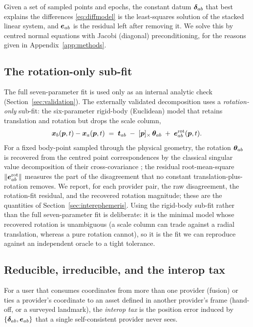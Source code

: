 Given a set of sampled points and epochs, the constant datum $\bm{\delta}_{ab}$ that best
explains the differences \eqref{eq:diffmodel} is the least-squares solution of the
stacked linear system, and $\bm{e}_{ab}$ is the residual left after removing it. We
solve this by centred normal equations with Jacobi (diagonal) preconditioning, for
the reasons given in Appendix~\ref{app:methods}.

\subsection{The rotation-only sub-fit}
\label{sec:rotonly}

The full seven-parameter fit is used only as an internal analytic check
(Section~\ref{sec:validation}). The externally validated decomposition uses a
\emph{rotation-only} sub-fit: the six-parameter rigid-body (Euclidean) model that
retains translation and rotation but drops the scale column,
\begin{equation}
  \bm{x}_b(\bm{p},t) - \bm{x}_a(\bm{p},t)
  \;=\; \bm{t}_{ab} \;-\;[\bm{p}]_\times\,\bm{\theta}_{ab}
   \;+\; \bm{e}^{\mathrm{rot}}_{ab}(\bm{p},t).
  \label{eq:rotonly}
\end{equation}
For a fixed body-point sampled through the physical geometry, the rotation
$\bm{\theta}_{ab}$ is recovered from the centred point correspondences by the classical
singular value decomposition of their cross-covariance
\citep{arun1987leastsquares}; the residual root-mean-square
$\|\bm{e}^{\mathrm{rot}}_{ab}\|$ measures the part of the disagreement that no
constant translation-plus-rotation removes. We report, for each provider pair, the
raw disagreement, the rotation-fit residual, and the recovered rotation magnitude;
these are the \Validated{} quantities of Section~\ref{sec:interephemeris}. Using the
rigid-body sub-fit rather than the full seven-parameter fit is deliberate: it is the
minimal model whose recovered rotation is unambiguous (a scale column can trade
against a radial translation, whereas a pure rotation cannot), so it is the fit we can
reproduce against an independent oracle to a tight tolerance.

\subsection{Reducible, irreducible, and the interop tax}
\label{sec:defs}

\begin{definition}
\label{def:tax}
For a user that consumes coordinates from more than one provider (fusion) or ties a
provider's coordinate to an asset defined in another provider's frame (hand-off, or a
surveyed landmark), the \emph{interop tax} is the position error induced by
$\{\bm{\delta}_{ab},\bm{e}_{ab}\}$ that a single self-consistent provider never sees.
\end{definition}

